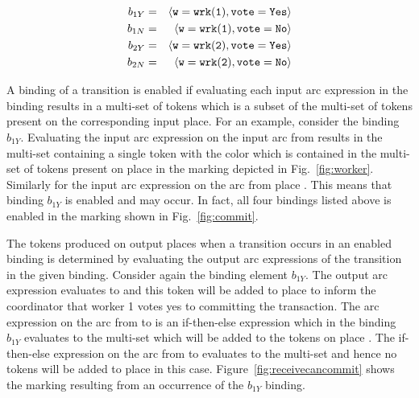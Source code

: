 \begin{eqnarray*}
b_{1Y} & = & \langle {\tt{w}} = {\tt{wrk(1)}}, {\tt{vote}} = {\tt{Yes}} \rangle \\
b_{1N} & = & \langle {\tt{w}} = {\tt{wrk(1)}}, {\tt{vote}} = {\tt{No}} \rangle \\
b_{2Y} & = & \langle {\tt{w}} = {\tt{wrk(2)}}, {\tt{vote}} = {\tt{Yes}} \rangle \\
b_{2N} & = & \langle {\tt{w}} = {\tt{wrk(2)}}, {\tt{vote}} = {\tt{No}} \rangle
\end{eqnarray*}

A binding of a transition is enabled if evaluating each input arc
expression in the binding results in a multi-set of tokens which is a
subset of the multi-set of tokens present on the corresponding input
place. For an example, consider the binding $b_{1Y}$. Evaluating the
input arc expression  on the input arc from 
results in the multi-set containing a single token with the color
 which is contained in the multi-set of tokens present
on place  in the marking depicted in
Fig.~\ref{fig:worker}. Similarly for the input arc expression on the
arc from place . This means that binding $b_{1Y}$
is enabled and may occur. In fact, all four bindings listed above
is enabled in the marking shown in Fig.~\ref{fig:commit}.


The tokens produced on output places when a transition occurs in an
enabled binding is determined by evaluating the output arc expressions
of the transition in the given binding. Consider again the binding
element $b_{1Y}$. The output arc expression 
evaluates to  and this token will be added to
place  to inform the coordinator that worker 1 votes
yes to committing the transaction. The arc expression on the arc from
 to  is an
if-then-else expression which in the binding $b_{1Y}$ evaluates to the
multi-set  which will be added to the tokens on
place . The if-then-else expression on the arc from
 to  evaluates to the
 multi-set and hence no tokens will be added to place
 in this case. Figure~\ref{fig:receivecancommit} shows
the marking resulting from an occurrence of the $b_{1Y}$ binding.

